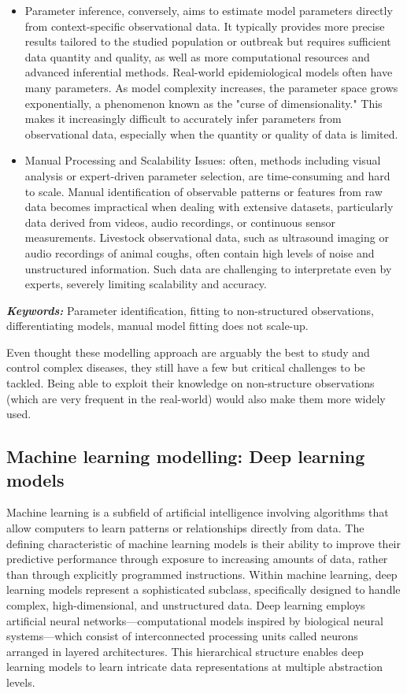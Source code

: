 \begin{itemize}
    \item Parameter inference, conversely, aims to estimate model parameters directly from context-specific observational data. It typically provides more precise results tailored to the studied population or outbreak but requires sufficient data quantity and quality, as well as more computational resources and advanced inferential methods. Real-world epidemiological models often have many parameters. As model complexity increases, the parameter space grows exponentially, a phenomenon known as the "curse of dimensionality." This makes it increasingly difficult to accurately infer parameters from observational data, especially when the quantity or quality of data is limited. 
    \item Manual Processing and Scalability Issues: often, methods including visual analysis or expert-driven parameter selection, are time-consuming and hard to scale. Manual identification of observable patterns or features from raw data becomes impractical when dealing with extensive datasets, particularly data derived from videos, audio recordings, or continuous sensor measurements. Livestock observational data, such as ultrasound imaging or audio recordings of animal coughs, often contain high levels of noise and unstructured information. Such data are challenging to interpretate even by experts, severely limiting scalability and accuracy.
\end{itemize}

\textit{\textbf{Keywords:}} Parameter identification, fitting to non-structured observations, differentiating models, manual model fitting does not scale-up.

Even thought these modelling approach are arguably the best to study and control complex diseases, they still have a few but critical challenges to be tackled. Being able to exploit their knowledge on non-structure observations (which are very frequent in the real-world) would also make them more widely used. 


\subsection{Machine learning modelling: Deep learning models}
Machine learning is a subfield of artificial intelligence involving algorithms that allow computers to learn patterns or relationships directly from data. The defining characteristic of machine learning models is their ability to improve their predictive performance through exposure to increasing amounts of data, rather than through explicitly programmed instructions. Within machine learning, deep learning models represent a sophisticated subclass, specifically designed to handle complex, high-dimensional, and unstructured data. Deep learning employs artificial neural networks—computational models inspired by biological neural systems—which consist of interconnected processing units called neurons arranged in layered architectures. This hierarchical structure enables deep learning models to learn intricate data representations at multiple abstraction levels.

